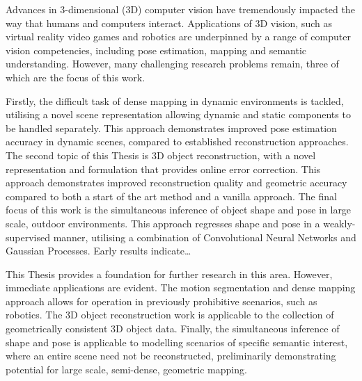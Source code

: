 Advances in 3-dimensional (3D) computer vision have tremendously impacted the way that humans and computers interact. 
Applications of 3D vision, such as virtual reality video games and robotics are underpinned by a range of 
computer vision competencies, including pose estimation, mapping and semantic understanding. However, 
many challenging research problems remain, three of which are the focus of this work.

Firstly, the difficult task of dense mapping in dynamic environments is tackled, utilising a 
novel scene representation allowing dynamic and static components to be handled separately. This approach demonstrates improved 
pose estimation accuracy in dynamic scenes, compared to established reconstruction approaches. The second topic of this Thesis is 
3D object reconstruction, with a novel representation and formulation that provides online error correction. This approach demonstrates 
improved reconstruction quality and geometric accuracy compared to both a start of the art method and a vanilla approach. The final focus 
of this work is the simultaneous inference of object shape and pose in large scale, outdoor environments. 
This approach regresses shape and pose in a weakly-supervised manner, utilising a combination of Convolutional Neural Networks 
and Gaussian Processes. Early results indicate\dots

This Thesis provides a foundation for further research in this area. However, immediate applications are evident. The motion 
segmentation and dense mapping approach allows for operation in previously prohibitive scenarios, such as robotics. The 3D object 
reconstruction work is applicable to the collection of geometrically consistent 3D object data. Finally, the simultaneous inference of 
shape and pose is applicable to modelling scenarios of specific semantic interest, where an entire scene need not be reconstructed, 
preliminarily demonstrating potential for large scale, semi-dense, geometric mapping.